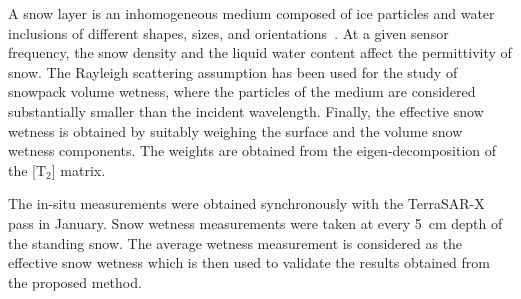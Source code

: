 A snow layer is an inhomogeneous medium composed of ice particles and water inclusions of different shapes, sizes, and orientations~\citep{Shi95wetness}. At a given sensor frequency, the snow density and the liquid water content affect the permittivity of snow. The Rayleigh scattering assumption has been used for the study of snowpack volume wetness, where the particles of the medium are considered substantially smaller than the incident wavelength. Finally, the effective snow wetness is obtained by suitably weighing the surface and the volume snow wetness components. The weights are obtained from the eigen-decomposition of the [$\mbox{T}_2$] matrix.

The in-situ measurements were obtained synchronously with the TerraSAR-X pass in January. Snow wetness measurements were taken at every 5~cm depth of the standing snow. The average wetness measurement is considered as the effective snow wetness which is then used to validate the results obtained from the proposed method.

